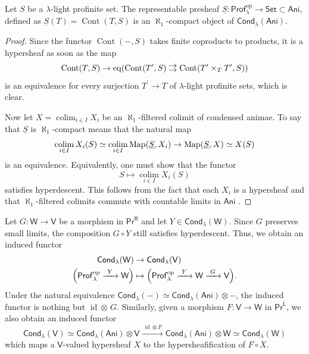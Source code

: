 \begin{lemma}\label{compact condensed anima}
    Let $S$ be a $\lambda$-light profinite set. The representable presheaf $\underline{S}\colon \mathsf{Prof}_\lambda^{\mathrm{op}}\to \mathsf{Set}\subset \mathsf{Ani}$, defined as $\underline{S}(T)=\operatorname{Cont}(T,S)$ is an $\aleph_1$-compact object of $\mathsf{Cond}_\lambda(\mathsf{Ani})$.
\end{lemma}

\begin{proof}
Since the functor $\operatorname{Cont}(-,S)$ takes finite coproducts to products, it is a hypersheaf as soon as the map
\[\operatorname{Cont}(T,S) \to \operatorname{eq}\mleft(\operatorname{Cont}(T^\prime,S)\rightrightarrows \operatorname{Cont}(T^\prime\times_T T^\prime,S)\mright)\]
is an equivalence for every surjection $T^\prime\to T$ of $\lambda$-light profinite sets, which is clear.

Now let $X=\operatorname*{colim}_{i\in I} X_i$ be an $\aleph_1$-filtered colimit of condensed animae. To say that $\underline{S}$ is $\aleph_1$-compact means that the natural map
\[\operatorname*{colim}_{i\in I} X_i(S)\simeq \operatorname*{colim}_{i\in I}\operatorname{Map}\mleft(\underline{S},X_i\mright)\to \operatorname{Map}\mleft(\underline{S},X\mright)\simeq X(S)\]
is an equivalence. Equivalently, one must show that the functor
\[S \mapsto \operatorname*{colim}_{i\in I} X_i(S)\]
satisfies hyperdescent. This follows from the fact that each $X_i$ is a hypersheaf and that $\aleph_1$-filtered colimits commute with countable limits in $\mathsf{Ani}$ \cite[Tag \href{https://kerodon.net/tag/05Y0}{05Y0}]{kerodon}.
\end{proof}

Let $G\colon \mathsf{W}\to \mathsf{V}$ be a morphism in $\mathsf{Pr}^\mathsf{R}$ and let $Y\in \mathsf{Cond}_\lambda(\mathsf{W})$. Since $G$ preserves small limits, the composition $G\circ Y$ still satisfies hyperdescent. Thus, we obtain an induced functor
\begin{align*}
    \mathsf{Cond}_\lambda(\mathsf{W}) &\to \mathsf{Cond}_\lambda(\mathsf{V}) \\
    \mleft(\mathsf{Prof}_\lambda^\mathrm{op}\xrightarrow{\ Y\ } \mathsf{W}\mright)&\mapsto \mleft(\mathsf{Prof}_\lambda^\mathrm{op}\xrightarrow{\ Y\ } \mathsf{W}\xrightarrow{\ G\ }\mathsf{V}\mright).
\end{align*}
Under the natural equivalence $\mathsf{Cond}_\lambda(-)\simeq \mathsf{Cond}_\lambda(\mathsf{Ani})\otimes -$, the induced functor is nothing but $\operatorname{id}\otimes \,G$. Similarly, given a morphism $F\colon \mathsf{V}\to \mathsf{W}$ in $\mathsf{Pr}^\mathsf{L}$, we also obtain an induced functor
\[\mathsf{Cond}_\lambda(\mathsf{V})\simeq \mathsf{Cond}_\lambda(\mathsf{Ani})\otimes \mathsf{V}\xrightarrow{\ \operatorname{id}\otimes F\ }\mathsf{Cond}_\lambda(\mathsf{Ani})\otimes \mathsf{W}\simeq \mathsf{Cond}_\lambda(\mathsf{W})\]
which maps a $\mathsf{V}$-valued hypersheaf $X$ to the hypersheafification of $F\circ X$.

